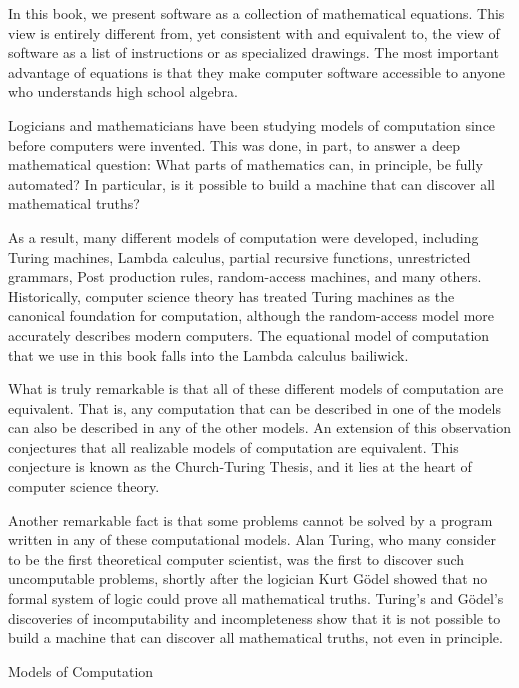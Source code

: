 In this book, we present software as a collection of mathematical
equations.  This view is entirely different from, yet consistent with
and equivalent to, the view of
software as a list of instructions or as specialized drawings.
The most important advantage of equations is that they make computer software accessible to anyone who understands high school algebra.

\begin{aside}
Logicians and mathematicians have been studying models of computation
since before computers were invented. This was done, in part, to
answer a deep mathematical question: What parts of mathematics can,
in principle, be fully automated?  In particular, is it possible to
build a machine that can discover all mathematical truths?

As a result, many different models of computation were developed,
including Turing machines, Lambda calculus, partial recursive
functions, unrestricted grammars, Post production rules, random-access
machines, and many others.  Historically, computer science theory has
treated Turing machines as the canonical foundation for computation,
although the random-access model more accurately describes modern computers.
The equational model of computation that we use in this book falls
into the Lambda calculus bailiwick.

What is truly remarkable is that all of these different models of
computation are equivalent.  That is,
any computation that can be described in one of the models can also
be described in any of the other models.  An extension of this observation
conjectures that all realizable models
of computation are equivalent.  This conjecture is known as the
Church-Turing Thesis, and it lies at the heart of computer science
theory.

Another remarkable fact is that some problems cannot be solved by a program
written in any of these computational models. Alan
Turing, who many consider to be the first theoretical computer
scientist, was the first to discover such uncomputable problems,
shortly after the logician Kurt G\"odel showed that no formal system
of logic could prove all mathematical truths.  Turing's and G\"odel's
discoveries of incomputability and incompleteness show that it is
not possible to build a machine that can discover all mathematical
truths, not even in principle.

\caption{Models of Computation}
\label{aside-model-of-computation}
\end{aside}


